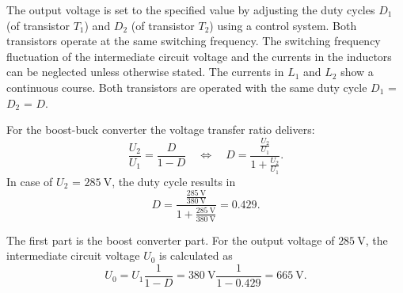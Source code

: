 The output voltage is set to the specified value by adjusting the duty cycles $D_\mathrm{1}$ (of transistor $T_\mathrm{1}$) 
and $D_\mathrm{2}$ (of transistor $T_\mathrm{2}$) using a control system. Both transistors operate at the same switching frequency. 
The switching frequency fluctuation of the intermediate circuit voltage and the currents in the inductors can be neglected unless otherwise stated. 
The currents in $L_\mathrm{1}$ and $L_\mathrm{2}$ show a continuous course. Both transistors are operated with the 
same duty cycle $D_\mathrm{1}$ = $D_\mathrm{2}$ = $D$.


\begin{solutionblock}
    For the boost-buck converter the voltage transfer ratio delivers:
    \begin{equation}
        \frac{U_\mathrm{2}}{U_\mathrm{1}} = \frac{D} {1-D}
        \quad \Leftrightarrow \quad
        D = \frac{\frac{U_\mathrm{2}}{U_\mathrm{1}}} {1+{\frac{U_\mathrm{2}}{U_\mathrm{1}}}}.
        \label{eq:DutyCycleEx03}
    \end{equation}
    In case of $U_\mathrm{2}$ = $\SI{285}{\volt}$, the duty cycle results in
    \begin{equation}
       D=\frac{\frac{\SI{285}{\volt}}{\SI{380}{\volt}}} {1+{\frac{\SI{285}{\volt}}{\SI{380}{\volt}}}} = 0.429.
    \end{equation}
\end{solutionblock}



\begin{solutionblock}
    The first part is the boost converter part. For the output voltage 
    of $\SI{285}{\volt}$, the intermediate circuit voltage $U_\mathrm{0}$ is calculated as
    \begin{equation}
        U_\mathrm{0}=U_\mathrm{1} \frac{1}{1-D} 
        =
        \SI{380}{\volt} \frac{1}{1-0.429} = \SI{665}{\volt}.
        \label{eq:DCLinkEx03}        
    \end{equation}
\end{solutionblock}



